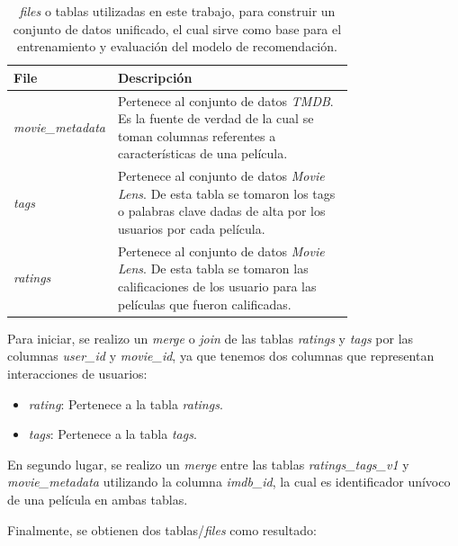 \documentclass[11pt,a4paper,twoside]{thesis}
\begin{document}
\begin{table}[!htb]
	\centering
	\footnotesize
	\begin{tabular}{l | p{0.75\linewidth}}
		\hline
		File                     & Descripción                                                                                                                                               \\
		\hline

		\textit{movie\_metadata} & Pertenece al conjunto de datos \textit{TMDB}. Es la fuente de verdad de la cual se toman columnas referentes a características de una película.           \\
		\textit{tags}            & Pertenece al conjunto de datos \textit{Movie Lens}. De esta tabla se tomaron los tags o palabras clave dadas de alta por los usuarios por cada película.  \\
		\textit{ratings}         & Pertenece al conjunto de datos \textit{Movie Lens}. De esta tabla se tomaron las calificaciones de los usuario para las películas que fueron calificadas. \\
		\hline
	\end{tabular}
	\caption{
		\textit{files} o tablas utilizadas en este trabajo, para construir un conjunto de datos unificado, el cual sirve como base para el entrenamiento y evaluación del modelo de recomendación.
	}
	\label{table:tableRatings}
\end{table}

Para iniciar, se realizo un \textit{merge} o \textit{join} de las tablas
\textit{ratings} y \textit{tags} por las columnas \textit{user\_id} y
\textit{movie\_id}, ya que tenemos dos columnas que representan interacciones
de usuarios:

\begin{itemize}
	\item \textit{rating}: Pertenece a la tabla \textit{ratings}.
	\item \textit{tags}: Pertenece a la tabla \textit{tags}.
\end{itemize}

En segundo lugar, se realizo un \textit{merge} entre las tablas
\textit{ratings\_tags\_v1} y \textit{movie\_metadata} utilizando la columna
\textit{imdb\_id}, la cual es identificador unívoco de una película en ambas
tablas.

Finalmente, se obtienen dos tablas/\textit{files} como resultado:
\end{document}

